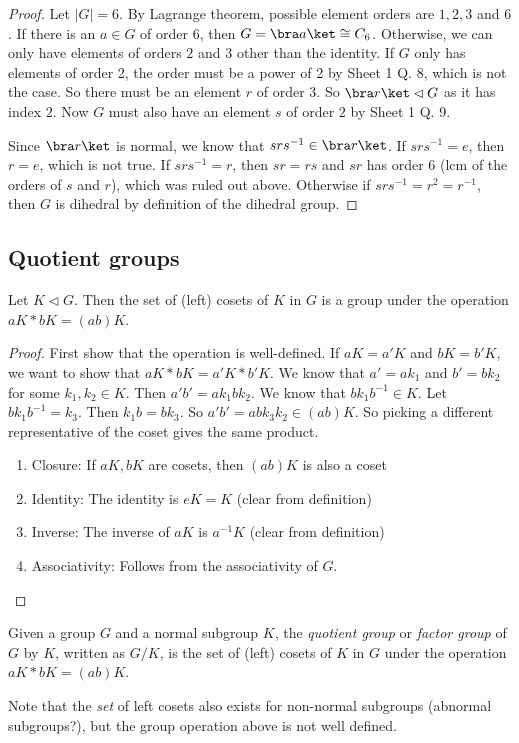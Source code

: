 \documentclass[a4paper]{article}
\begin{document}
\begin{proof}
  Let $|G| = 6$. By Lagrange theorem, possible element orders are $1, 2, 3$ and $6$. If there is an $a\in G$ of order $6$, then $G = \bra a\ket \cong C_6$. Otherwise, we can only have elements of orders $2$ and $3$ other than the identity. If $G$ only has elements of order 2, the order must be a power of 2 by Sheet 1 Q. 8, which is not the case. So there must be an element $r$ of order 3. So $\bra r\ket\lhd G$ as it has index $2$. Now $G$ must also have an element $s$ of order $2$ by Sheet 1 Q. 9.

  Since $\bra r\ket$ is normal, we know that $srs^{-1}\in \bra r\ket$. If $srs^{-1} = e$, then $r = e$, which is not true. If $srs^{-1} = r$, then $sr = rs$ and $sr$ has order $6$ (lcm of the orders of $s$ and $r$), which was ruled out above. Otherwise if $srs^{-1} = r^2 = r^{-1}$, then $G$ is dihedral by definition of the dihedral group.
\end{proof}

\subsection{Quotient groups}
\begin{prop}
  Let $K\lhd G$. Then the set of (left) cosets of $K$ in $G$ is a group under the operation $aK*bK = (ab)K$.
\end{prop}

\begin{proof}
  First show that the operation is well-defined. If $aK = a'K$ and $bK = b'K$, we want to show that $aK*bK = a'K * b'K$. We know that $a' = ak_1$ and $b' = bk_2$ for some $k_1, k_2\in K$. Then $a'b' = ak_1bk_2$. We know that $bk_1b^{-1}\in K$. Let $bk_1b^{-1} = k_3$. Then $k_1 b = bk_3$. So $a'b' = abk_3k_2\in (ab)K$. So picking a different representative of the coset gives the same product.
  \begin{enumerate}[label=\arabic{*}.]
    \item Closure: If $aK, bK$ are cosets, then $(ab)K$ is also a coset
    \item Identity: The identity is $eK = K$ (clear from definition)
    \item Inverse: The inverse of $aK$ is $a^{-1}K$ (clear from definition)
    \item Associativity: Follows from the associativity of $G$.
  \end{enumerate}
\end{proof}

\begin{defi}
  Given a group $G$ and a normal subgroup $K$, the \emph{quotient group} or \emph{factor group} of $G$ by $K$, written as $G/K$, is the set of (left) cosets of $K$ in $G$ under the operation $aK*bK = (ab)K$.
\end{defi}
Note that the \emph{set} of left cosets also exists for non-normal subgroups (abnormal subgroups?), but the group operation above is not well defined.
\end{document}
